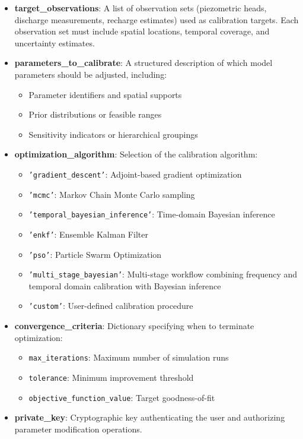 \begin{itemize}
\item \textbf{target\_observations}: A list of observation sets (piezometric heads, discharge measurements, recharge estimates) used as calibration targets. Each observation set must include spatial locations, temporal coverage, and uncertainty estimates.

\item \textbf{parameters\_to\_calibrate}: A structured description of which model parameters should be adjusted, including:
\begin{itemize}
    \item Parameter identifiers and spatial supports
    \item Prior distributions or feasible ranges
    \item Sensitivity indicators or hierarchical groupings
\end{itemize}

\item \textbf{optimization\_algorithm}: Selection of the calibration algorithm:
\begin{itemize}
    \item \texttt{'gradient\_descent'}: Adjoint-based gradient optimization
    \item \texttt{'mcmc'}: Markov Chain Monte Carlo sampling
    \item \texttt{'temporal\_bayesian\_inference'}: Time-domain Bayesian inference
    \item \texttt{'enkf'}: Ensemble Kalman Filter
    \item \texttt{'pso'}: Particle Swarm Optimization
    \item \texttt{'multi\_stage\_bayesian'}: Multi-stage workflow combining frequency and temporal domain calibration with Bayesian inference
    \item \texttt{'custom'}: User-defined calibration procedure
\end{itemize}

\item \textbf{convergence\_criteria}: Dictionary specifying when to terminate optimization:
\begin{itemize}
    \item \texttt{max\_iterations}: Maximum number of simulation runs
    \item \texttt{tolerance}: Minimum improvement threshold
    \item \texttt{objective\_function\_value}: Target goodness-of-fit
\end{itemize}

\item \textbf{private\_key}: Cryptographic key authenticating the user and authorizing parameter modification operations.
\end{itemize}

